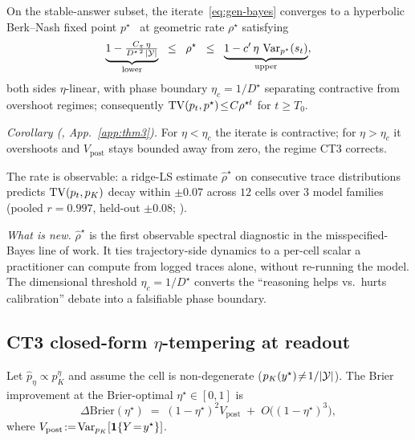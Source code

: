 \begin{theorem}
\label{thm:ct2-body}
On the stable-answer subset, the iterate~\eqref{eq:gen-bayes} converges to a hyperbolic Berk--Nash fixed point $p^\star$~\citep{esponda2016,fudenberg2021} at geometric rate $\rho^\star$ satisfying
\begin{equation}
\underbrace{1 - \tfrac{C_\pi\,\eta}{D^{\star\,2}\,|\mathcal{Y}|}}_{\text{lower}}
\;\;\le\;\;
\rho^\star
\;\;\le\;\;
\underbrace{1 - c'\,\eta\,\operatorname{Var}_{p^\star}(s_t)}_{\text{upper}},
\label{eq:rho-envelope}
\end{equation}
both sides $\eta$-linear, with phase boundary $\eta_c\!=\!1/D^\star$ separating contractive from overshoot regimes; consequently $\operatorname{TV}(p_t,p^\star)\!\le\!C\rho^{\star t}$ for $t\!\ge\!T_0$.
\end{theorem}
\label{thm:berk-nash-rate}\label{thm:rho-concentration}\label{thm:eta-bayes}\label{thm:t3-decomposition-body}\label{eq:bn-rate}

\noindent\emph{Corollary (, App.~\ref{app:thm3}).} For $\eta\!<\!\eta_c$ the iterate is contractive; for $\eta\!>\!\eta_c$ it overshoots and $V_{\mathrm{post}}$ stays bounded away from zero, the regime CT3 corrects.\label{cor:phase-boundary}

The rate is observable: a ridge-LS estimate $\widehat\rho^\star$ on consecutive trace distributions predicts $\operatorname{TV}(p_t,p_K)$ decay within $\pm 0.07$ across $12$ cells over $3$ model families (pooled $r\!=\!0.997$, held-out $\pm 0.08$; ).

\textit{What is new.} $\widehat\rho^\star$ is the first observable spectral diagnostic in the misspecified-Bayes line of work. It ties trajectory-side dynamics to a per-cell scalar a practitioner can compute from logged traces alone, without re-running the model. The dimensional threshold $\eta_c\!=\!1/D^\star$ converts the ``reasoning helps vs.\ hurts calibration'' debate into a falsifiable phase boundary.

\subsection{CT3 closed-form $\eta$-tempering at readout}
\label{sec:ct3}\label{sec:ct4}\label{sec:eta-tempering}

\begin{theorem}
\label{thm:t3-intervention}
Let $\hat p_\eta\!\propto\!p_K^{\eta}$ and assume the cell is non-degenerate ($p_K(y^\star)\!\ne\!1/|\mathcal{Y}|$). The Brier improvement at the Brier-optimal $\eta^\star\!\in\![0,1]$ is
\begin{equation}
\Delta\mathrm{Brier}(\eta^\star)\;=\;(1\!-\!\eta^\star)^{2}V_{\mathrm{post}}\;+\;O\!\big((1\!-\!\eta^\star)^{3}\big),
\label{eq:brier-closed-form}
\end{equation}
where $V_{\mathrm{post}}\!:=\!\operatorname{Var}_{p_K}[\bm{1}\{Y\!=\!y^\star\}]$.
\end{theorem}

